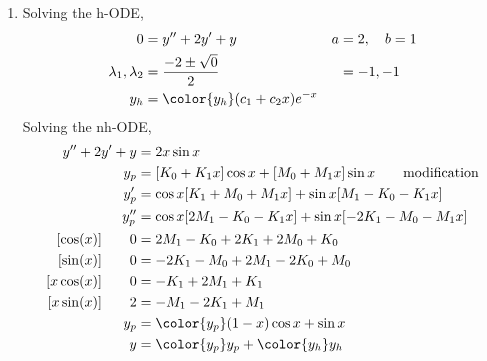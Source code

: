 \begin{enumerate}
    \item Solving the h-ODE,
          \begin{align}
              0                        & = y'' + 2y' + y                      &
              a                        & = 2, \quad b = 1                       \\
              \lambda_{1}, \lambda_{2} & = \frac{-2 \pm \sqrt{0}}{2}          &
                                       & = -1, -1                               \\
              y_{h}                    & = \color{y_h} (c_{1} + c_{2}x)e^{-x}
          \end{align}
          Solving the nh-ODE,
          \begin{align}
              y'' + 2y' + y       & = 2x\sin x                                  \\
              y_{p}               & = [K_{0} + K_{1}x] \cos x + [M_{0}
              + M_{1}x]\sin x         \qquad \text{modification}                \\
              y_{p}'              & = \cos x [K_{1} + M_{0} + M_{1}x]
              + \sin x [M_{1} - K_{0} - K_{1}x]                                 \\
              y_{p}''             & = \cos x [2M_{1} - K_{0} - K_{1}x]
              + \sin x [-2K_{1} - M_{0} - M_{1}x]                               \\
              [\cos(x)] \qquad 0  & =  2M_{1} - K_{0} + 2K_{1} + 2M_{0} + K_{0} \\
              [\sin(x)] \qquad 0  & = -2K_{1} - M_{0} + 2M_{1} - 2K_{0} + M_{0} \\
              [x\cos(x)] \qquad 0 & =  -K_{1} + 2M_{1} + K_{1}                  \\
              [x\sin(x)] \qquad 2 & = -M_{1} - 2K_{1} + M_{1}                   \\
              y_{p}               & = \color{y_p} (1-x)\cos x + \sin x          \\
              y                   & = {\color{y_p} y_{p}} + {\color{y_h} y_{h}}
          \end{align}


\end{enumerate}
